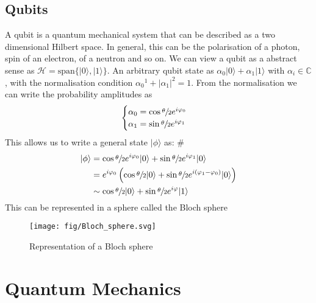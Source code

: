 \documentclass[12pt]{book}
\theoremstyle{definition}
\newcommand{\C}{\mathbb C}
\newcommand{\p}{\varphi}
\newcommand{\abs}[1]{\left\vert {#1}\right\vert}
\newcommand{\para}[1]{\left( {#1} \right)}
\newcommand{\ket}[1]{\vert {#1} \rangle}
\begin{document}
\section*{Qubits}
A qubit is a quantum mechanical system that can be described as a two dimensional Hilbert space. In general, this can be the polarisation of a photon, spin of an electron, of a neutron and so on. We can view a qubit as a abstract sense as $\mathcal H = \mathrm{span}\{\ket{0}, \ket{1}\}$. An arbitrary qubit state as $\alpha_0 \ket{0} + \alpha_1 \ket{1}$ with $\alpha_i \in \C$, with the normalisation condition ${\alpha_0}^1 + \abs{\alpha_1}^2 = 1$. From the normalisation we can write the probability amplitudes as
\begin{equation}
  \begin{cases}
    \alpha_0 = \cos \sfrac \theta 2 e^{i\p_0} \\
    \alpha_1 = \sin \sfrac \theta 2 e^{i\p_1}
  \end{cases}
\end{equation}
This allows us to write a general state $\ket\phi$ as:
\#\begin{align*}
 \ket{\phi} & = \cos \sfrac\theta 2 e^{i\p_0} \ket{0} + \sin \sfrac \theta 2 e^{i\p_1} \ket{0} \\
 & = e^{i\p_0} \para{\cos \sfrac \theta 2 \ket{0} + \sin \sfrac \theta 2 e^{i(\p_1 - \p_0)} \ket{0}} \\
 & \sim \cos \sfrac \theta 2 \ket{0} + \sin \sfrac \theta 2 e^{i\p} \ket{1}
\end{align*}
This can be represented in a sphere called the Bloch sphere
\begin{figure}[h!]
	\centering
  \texttt{[image: fig/Bloch\_sphere.svg]}
  \caption{Representation of a Bloch sphere }%
\end{figure}

\chapter{Quantum Mechanics}
\end{document}
